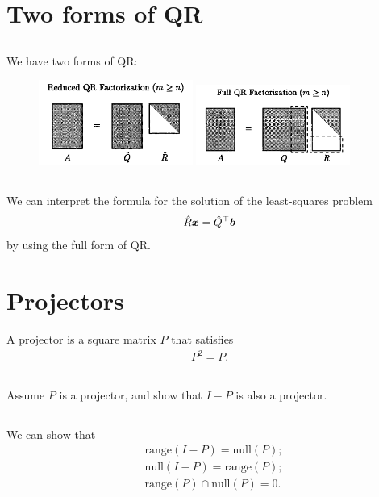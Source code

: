 \documentclass[11pt,letterpaper]{report}
\begin{document}
\section{Two forms of QR}
\subsection{}
We have two forms of QR:
\begin{figure}[H]
    \centering
    \includegraphics[width = 0.45\textwidth]{Session_5/latex/figs/TB_reducedQR}
    \includegraphics[width = 0.45\textwidth]{Session_5/latex/figs/TB_fullQR}
\end{figure}

\subsection{}
We can interpret the formula for the solution of the least-squares problem
\begin{align*}
    \hat R \boldsymbol{x} = \hat Q^\top \boldsymbol{b}
\end{align*}
by using the full form of QR.

\section{Projectors}
A projector is a square matrix $P$ that satisfies
\begin{align*}
    P^2 = P.
\end{align*}

\subsection{}
Assume $P$ is a projector, and show that $I-P$ is also a projector.

\subsection{}
We can show that
\begin{align*}
    & \text{range}(I-P) = \text{null}(P);\\
    & \text{null}(I-P) = \text{range}(P);\\
    & \text{range}(P) \cap \text{null}(P) = 0.
\end{align*}
\end{document}
